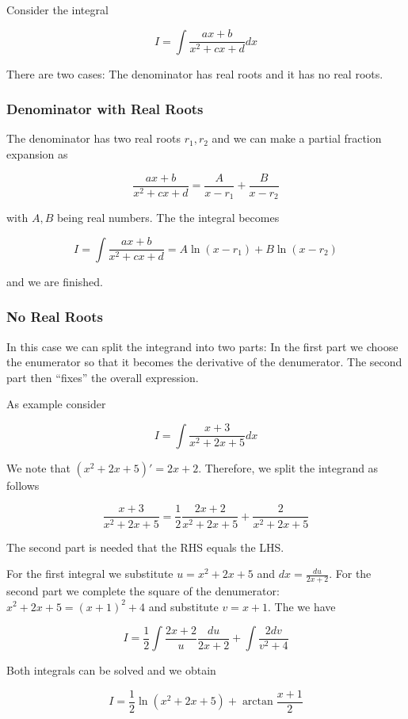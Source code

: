 
Consider the integral

\[
I = \int \frac{ax+b}{x^2 + c x + d} dx
\]

There are two cases: The denominator has real roots and it has no real
roots.

\subsubsection{Denominator with Real Roots}

The denominator has two real roots \(r_1, r_2\) and we can make a
partial fraction expansion as

\[
\frac{ax+b}{x^2 + c x + d} = \frac{A}{x-r_1} + \frac{B}{x-r_2}
\]

with \(A, B\) being real numbers. The the integral becomes

\[
I = \int \frac{ax+b}{x^2 + c x + d} = A \ln(x-r_1) + B \ln(x-r_2)
\]

and we are finished.

\subsubsection{No Real Roots}

In this case we can split the integrand into two parts: In the first
part we choose the enumerator so that it becomes the derivative of the denumerator. The second part then ``fixes'' the overall expression.

As example consider

\[
I = \int \frac{x+3}{x^2+2x+5} dx
\]

We note that \((x^2+2x+5)' = 2x+2\). Therefore, we split the integrand
as follows

\[
\frac{x+3}{x^2+2x+5} = \frac{1}{2} \frac{2x+2}{x^2+2x+5} + \frac{2}{x^2+2x+5}
\]

The second part is needed that the RHS equals the LHS.

For the first integral we substitute \(u = x^2+2x+5\) and
\(dx = \frac{du}{2x+2}\). For the second part we complete the square of
the denumerator: \(x^2+2x+5 = (x+1)^2+4\) and substitute \(v = x+1\).
The we have

\[
I = \frac{1}{2} \int \frac{2x+2}{u} \frac{du}{2x+2} + \int \frac{2 dv}{v^2 + 4}
\]

Both integrals can be solved and we obtain

\[
I = \frac{1}{2} \ln(x^2+2x+5) + \arctan \frac{x+1}{2}
\]
